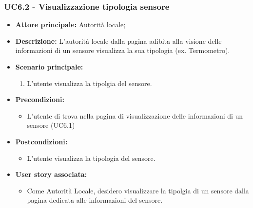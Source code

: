 \documentclass{article}
\begin{document}
\subsubsection{UC6.2 - Visualizzazione tipologia sensore}
\begin{itemize}
    \item \textbf{Attore principale:} Autorità locale;
    \item \textbf{Descrizione:} L’autorità locale dalla pagina adibita alla visione delle informazioni di un sensore visualizza la sua tipologia (ex. Termometro).
    \item \textbf{Scenario principale:}
          \begin{enumerate}
              \item L'utente visualizza la tipolgia del sensore.
          \end{enumerate}
    \item \textbf{Precondizioni:}
          \begin{itemize}
              \item  L'utente di trova nella pagina di visualizzazione delle informazioni di un sensore (UC6.1)
          \end{itemize}
    \item \textbf{Postcondizioni:}
          \begin{itemize}
              \item  L'utente visualizza la tipologia del sensore.
          \end{itemize}\item \textbf{User story associata:}
          \begin{itemize}
              \item Come Autorità Locale, desidero visualizzare la tipolgia di un sensore dalla pagina dedicata alle informazioni del sensore.
          \end{itemize}


\end{itemize}
\end{document}
